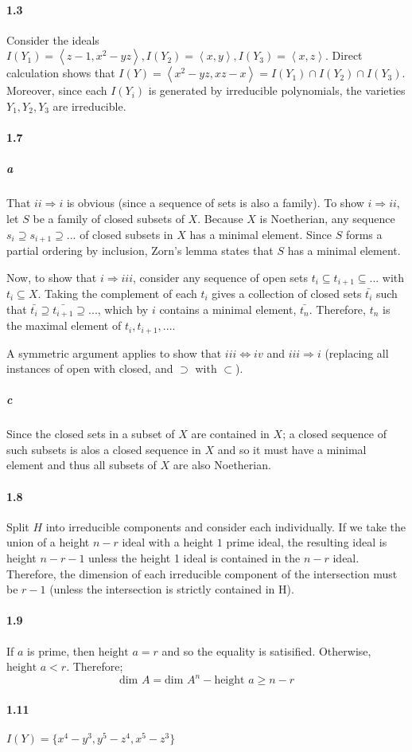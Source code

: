 \documentclass{article}
\begin{document}
\paragraph{1.3}
Consider the ideals $I(Y_1) = \left \langle z - 1, x^2 - yz \right \rangle, I(Y_2) = \left \langle x, y \right \rangle, I(Y_3) = \left \langle x, z \right \rangle$.  Direct calculation shows that $I(Y) = \left \langle x^2 - yz, xz -x \right \rangle = I(Y_1) \cap I(Y_2) \cap I(Y_3)$.  Moreover, since each $I(Y_i)$ is generated by irreducible polynomials, the varieties $Y_1, Y_2, Y_3$ are irreducible.

\paragraph{1.7}
\subparagraph{a}
That $ii \Rightarrow i$ is obvious (since a sequence of sets is also a family).  To show $i \Rightarrow ii$, let $S$ be a family of closed subsets of $X$.  Because $X$ is Noetherian, any sequence $s_i \supseteq s_{i+1} \supseteq ... $ of closed subsets in $X$ has a minimal element.  Since $S$ forms a partial ordering by inclusion, Zorn's lemma states that $S$ has a minimal element. 

Now, to show that $i \Rightarrow iii$, consider any sequence of open sets $t_i \subseteq t_{i+1} \subseteq ...$ with $t_i \subseteq X$.  Taking the complement of each $t_i$ gives a collection of closed sets $\bar{t_i}$ such that $\bar{t_i} \supseteq \bar{t_{i+1}} \supseteq ... $, which by $i$ contains a minimal element, $\bar{t_n}$.  Therefore, $t_n$ is the maximal element of $t_i, t_{i+1}, ...$.

A symmetric argument applies to show that $iii \Leftrightarrow iv$ and $iii \Rightarrow i$ (replacing all instances of open with closed, and $\supset$ with $\subset$).

\subparagraph{c}
Since the closed sets in a subset of $X$ are contained in $X$; a closed sequence of such subsets is alos a closed sequence in $X$ and so it must have a minimal element and thus all subsets of $X$ are also Noetherian.

\paragraph{1.8}
Split $H$ into irreducible components and consider each individually.  If we take the union of a height $n - r$ ideal with a height $1$ prime ideal, the resulting ideal is height $n - r - 1$ unless the height 1 ideal is contained in the $n-r$ ideal.  Therefore, the dimension of each irreducible component of the intersection must be $r - 1$ (unless the intersection is strictly contained in H).

\paragraph{1.9}
If $a$ is prime, then $\textrm{height }a = r$ and so the equality is satisified.  Otherwise, $\textrm{height } a < r$.  Therefore;
\[ \textrm{dim } A = \textrm{dim } A^n - \textrm{height } a \geq n - r \]

\paragraph{1.11}
$I(Y) = \{ x^4 - y^3, y^5 - z^4, x^5 - z^3 \}$
\end{document}
